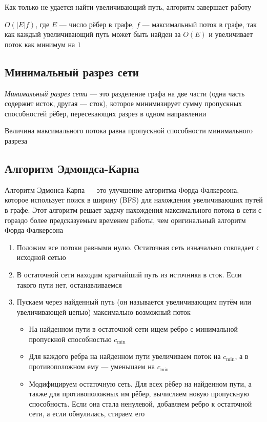 \documentclass[a4paper]{article}
\begin{document}
Как только не удается найти увеличивающий путь, алгоритм завершает работу

\difficulty $O(|E|f)$, где $E$ —  число рёбер в графе, $f$ — максимальный поток в графе, так как каждый увеличивающий путь может быть найден за $O(E)$ и увеличивает поток как минимум на $1$

\subsection{Минимальный разрез сети}
 \textit{Минимальный разрез сети} — это  разделение графа на две части (одна часть содержит исток, другая — сток), которое минимизирует сумму пропускных способностей рёбер, пересекающих разрез в одном направлении

\comment Величина максимального потока равна пропускной способности минимального разреза

\subsection{Алгоритм Эдмондса-Карпа}
Алгоритм Эдмонса-Карпа — это улучшение алгоритма Форда-Фалкерсона, которое использует поиск в ширину (BFS) для нахождения увеличивающих путей в графе. Этот алгоритм решает задачу нахождения максимального потока в сети с гораздо более предсказуемым временем работы, чем оригинальный алгоритм Форда-Фалкерсона

\begin{enumerate}
    \item Положим все потоки равными нулю. Остаточная сеть изначально совпадает с исходной сетью
    \item В остаточной сети находим кратчайший путь из источника в сток. Если такого пути нет, останавливаемся
    \item Пускаем через найденный путь (он называется увеличивающим путём или увеличивающей цепью) максимально возможный поток
    \begin{itemize}
        \item На найденном пути в остаточной сети ищем ребро с минимальной пропускной способностью $c_{\min}$
        \item Для каждого ребра на найденном пути увеличиваем поток на $c_{\min}$, а в противоположном ему — уменьшаем на $c_{\min}$
        \item Модифицируем остаточную сеть. Для всех рёбер на найденном пути, а также для противоположных им рёбер, вычисляем новую пропускную способность. Если она стала ненулевой, добавляем ребро к остаточной сети, а если обнулилась, стираем его
    \end{itemize}
\end{enumerate}
\end{document}
